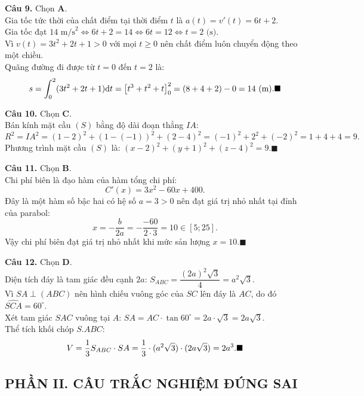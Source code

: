 \documentclass[12pt,a4paper]{article}
\begin{document}
\vspace{0.2cm}\noindent\textbf{Câu 9.} Chọn \textbf{A}.\\
Gia tốc tức thời của chất điểm tại thời điểm $t$ là $a(t) = v'(t) = 6t + 2$.\\
Gia tốc đạt $14\text{ m/s}^2 \iff 6t + 2 = 14 \iff 6t = 12 \iff t = 2\text{ (s)}$.\\
Vì $v(t) = 3t^2 + 2t + 1 > 0$ với mọi $t \ge 0$ nên chất điểm luôn chuyển động theo một chiều.\\
Quãng đường đi được từ $t = 0$ đến $t = 2$ là:
$$s = \int_0^2 (3t^2 + 2t + 1) \mathrm{d}t = \left[t^3 + t^2 + t\right]_0^2 = (8 + 4 + 2) - 0 = 14\text{ (m)}.\hfill\blacksquare$$

\vspace{0.2cm}\noindent\textbf{Câu 10.} Chọn \textbf{C}.\\
Bán kính mặt cầu $(S)$ bằng độ dài đoạn thẳng $IA$:
$$R^2 = IA^2 = (1 - 2)^2 + (1 - (-1))^2 + (2 - 4)^2 = (-1)^2 + 2^2 + (-2)^2 = 1 + 4 + 4 = 9.$$
Phương trình mặt cầu $(S)$ là: $(x - 2)^2 + (y + 1)^2 + (z - 4)^2 = 9$.\hfill$\blacksquare$

\vspace{0.2cm}\noindent\textbf{Câu 11.} Chọn \textbf{B}.\\
Chi phí biên là đạo hàm của hàm tổng chi phí:
$$C'(x) = 3x^2 - 60x + 400.$$
Đây là một hàm số bậc hai có hệ số $a = 3 > 0$ nên đạt giá trị nhỏ nhất tại đỉnh của parabol:
$$x = -\dfrac{b}{2a} = -\dfrac{-60}{2 \cdot 3} = 10 \in [5; 25].$$
Vậy chi phí biên đạt giá trị nhỏ nhất khi mức sản lượng $x = 10$.\hfill$\blacksquare$

\vspace{0.2cm}\noindent\textbf{Câu 12.} Chọn \textbf{D}.\\
Diện tích đáy là tam giác đều cạnh $2a$: $S_{ABC} = \dfrac{(2a)^2\sqrt{3}}{4} = a^2\sqrt{3}$.\\
Vì $SA \perp (ABC)$ nên hình chiếu vuông góc của $SC$ lên đáy là $AC$, do đó $\widehat{SCA} = 60^\circ$.\\
Xét tam giác $SAC$ vuông tại $A$: $SA = AC \cdot \tan 60^\circ = 2a \cdot \sqrt{3} = 2a\sqrt{3}$.\\
Thể tích khối chóp $S.ABC$:
$$V = \dfrac{1}{3} S_{ABC} \cdot SA = \dfrac{1}{3} \cdot (a^2\sqrt{3}) \cdot (2a\sqrt{3}) = 2a^3.\hfill\blacksquare$$

\subsection*{\large PHẦN II. CÂU TRẮC NGHIỆM ĐÚNG SAI}
\end{document}

